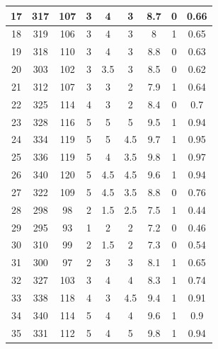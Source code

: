 \documentclass[11pt]{article}
\begin{document}
\begin{appendix}
\begin{longtable}[H]{|c|c|c|c|c|c|c|c|c|}
	17         & 317       & 107         & 3  & 4   & 3   & 8.7  & 0        & 0.66            \\ \hline
	18         & 319       & 106         & 3  & 4   & 3   & 8    & 1        & 0.65            \\ \hline
	19         & 318       & 110         & 3   & 4   & 3   & 8.8  & 0        & 0.63            \\ \hline
	20         & 303       & 102         & 3  & 3.5 & 3   & 8.5  & 0        & 0.62            \\ \hline
	21         & 312       & 107         & 3 & 3   & 2   & 7.9  & 1        & 0.64            \\ \hline
	22         & 325       & 114         & 4    & 3   & 2   & 8.4  & 0        & 0.7             \\ \hline
	23         & 328       & 116         & 5  & 5   & 5   & 9.5  & 1        & 0.94            \\ \hline
	24         & 334       & 119         & 5   & 5   & 4.5 & 9.7  & 1        & 0.95            \\ \hline
	25         & 336       & 119         & 5  & 4   & 3.5 & 9.8  & 1        & 0.97            \\ \hline
	26         & 340       & 120         & 5   & 4.5 & 4.5 & 9.6  & 1        & 0.94            \\ \hline
	27         & 322       & 109         & 5  & 4.5 & 3.5 & 8.8  & 0        & 0.76            \\ \hline
	28         & 298       & 98          & 2   & 1.5 & 2.5 & 7.5  & 1        & 0.44            \\ \hline
	29         & 295       & 93          & 1   & 2   & 2   & 7.2  & 0        & 0.46            \\ \hline
	30         & 310       & 99          & 2  & 1.5 & 2   & 7.3  & 0        & 0.54            \\ \hline
	31         & 300       & 97          & 2   & 3   & 3   & 8.1  & 1        & 0.65            \\ \hline
	32         & 327       & 103         & 3   & 4   & 4   & 8.3  & 1        & 0.74            \\ \hline
	33         & 338       & 118         & 4  & 3   & 4.5 & 9.4  & 1        & 0.91            \\ \hline
	34         & 340       & 114         & 5   & 4   & 4   & 9.6  & 1        & 0.9             \\ \hline
	35         & 331       & 112         & 5  & 4   & 5   & 9.8  & 1        & 0.94            \\ \hline

\end{longtable}
\end{appendix}
\end{document}
